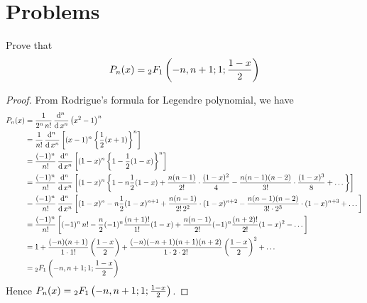 \documentclass[../main-sheet.tex]{subfiles}
\begin{document}
\section{Problems}
\begin{prob}
    Prove that
    \[
        P_n(x)={}_2F_1\left( -n,n+1;1;\frac{1-x}{2} \right)
    \]
\end{prob}
\begin{proof}
    From Rodrigue's formula for Legendre polynomial, we have
    \begin{align*}
        P_n(x)&= \frac{1}{2^n\,n!}\,\frac{\mathrm{d}^{n}\, }{\mathrm{d}\, x^{n}}\left( x^2-1 \right)^n\\
        &= \frac{1}{n!}\,\frac{\mathrm{d}^{n}\, }{\mathrm{d}\, x^{n}}\left[(x-1)^n \left\{\frac{1}{2}( x+1) \right\}^n\right]\\
        &= \frac{(-1)^n}{n!}\,\frac{\mathrm{d}^{n}\, }{\mathrm{d}\, x^{n}}\left[(1-x)^n \left\{1-\frac{1}{2}(1- x) \right\}^n\right]\\
        &= \frac{(-1)^n}{n!} \,\frac{\mathrm{d}^{n}\, }{\mathrm{d}\, x^{n}} \left[(1-x)^n \left\{1-n\frac{1}{2}(1- x)+\frac{n(n-1)}{2!}\cdot\frac{(1-x)^2}{4}-\frac{n(n-1)(n-2)}{3!}\cdot\frac{(1-x)^3}{8}+\dots \right\}\right]\\
        &= \frac{(-1)^n}{n!} \,\frac{\mathrm{d}^{n}\, }{\mathrm{d}\, x^{n}} \left[(1-x)^n-n\frac{1}{2}(1- x)^{n+1}+\frac{n(n-1)}{2!\, 2^2}\cdot(1-x)^{n+2}-\frac{n(n-1)(n-2)}{3!\cdot 2^3}\cdot(1-x)^{n+3}+\dots\right]\\
        &=\frac{(-1)^n}{n!}\left[ (-1)^n\,n!-\frac{n}{2}(-1)^n\frac{(n+1)!}{1!}(1-x)+\frac{n(n-1)}{2!}(-1)^n\frac{(n+2)!}{2!}(1-x)^2-\dots \right]\\
        &=1+\frac{(-n)(n+1)}{1\cdot 1!}\left( \frac{1-x}{2} \right)+\frac{(-n)(-n+1)(n+1)(n+2)}{1\cdot2\cdot2!}\left( \frac{1-x}{2} \right)^2+\dots\\
        &={}_2F_1\left( -n,n+1;1;\frac{1-x}{2} \right)
    \end{align*}
    Hence \( P_n(x)={}_2F_1\left( -n,n+1;1;\frac{1-x}{2} \right) \).
\end{proof}
\end{document}
